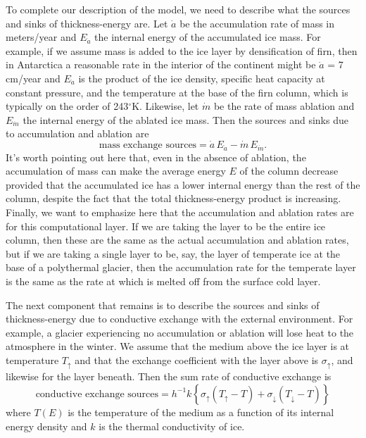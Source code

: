 \documentclass{article}
\theoremstyle{definition}
\theoremstyle{plain}
\begin{document}
To complete our description of the model, we need to describe what the sources and sinks of thickness-energy are.
Let $\dot a$ be the accumulation rate of mass in meters/year and $E_{\dot a}$ the internal energy of the accumulated ice mass.
For example, if we assume mass is added to the ice layer by densification of firn, then in Antarctica a reasonable rate in the interior of the continent might be $\dot a$ = 7 cm/year and $E_{\dot a}$ is the product of the ice density, specific heat capacity at constant pressure, and the temperature at the base of the firn column, which is typically on the order of 243${}^\circ$K.
Likewise, let $\dot m$ be the rate of mass ablation and $E_{\dot m}$ the internal energy of the ablated ice mass.
Then the sources and sinks due to accumulation and ablation are
\begin{equation}
    \text{mass exchange sources} = \dot a\,E_{\dot a} - \dot m\,E_{\dot m}.
\end{equation}
It's worth pointing out here that, even in the absence of ablation, the accumulation of mass can make the average energy $E$ of the column decrease provided that the accumulated ice has a lower internal energy than the rest of the column, despite the fact that the total thickness-energy product is increasing.
Finally, we want to emphasize here that the accumulation and ablation rates are for this computational layer.
If we are taking the layer to be the entire ice column, then these are the same as the actual accumulation and ablation rates, but if we are taking a single layer to be, say, the layer of temperate ice at the base of a polythermal glacier, then the accumulation rate for the temperate layer is the same as the rate at which is melted off from the surface cold layer.

The next component that remains is to describe the sources and sinks of thickness-energy due to conductive exchange with the external environment.
For example, a glacier experiencing no accumulation or ablation will lose heat to the atmosphere in the winter.
We assume that the medium above the ice layer is at temperature $T_{\uparrow}$ and that the exchange coefficient with the layer above is $\sigma_{\uparrow}$, and likewise for the layer beneath.
Then the sum rate of conductive exchange is
\begin{equation}
    \text{conductive exchange sources} = h^{-1}k\left\{\sigma_{\uparrow}(T_{\uparrow} - T) + \sigma_{\downarrow}(T_{\downarrow} - T)\right\}
\end{equation}
where $T(E)$ is the temperature of the medium as a function of its internal energy density and $k$ is the thermal conductivity of ice.
\end{document}
